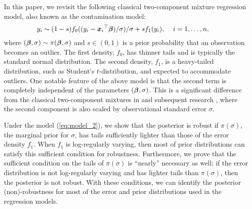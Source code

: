 \documentclass[12pt]{article}
\def\si{{\sigma}}
\def\si{{\sigma}}
\def\si{{\sigma}}
\def\bbe{{\text{\boldmath $\beta$}}}
\def\x{{\text{\boldmath $x$}}}
\begin{document}
In this paper, we revisit the following classical two-component mixture regression model, also known as the contamination model:
\begin{align}
\label{eq:model_2} 
&y_i \sim (1 - s) f_0 (( y_i - {\x _i}^{\top } \bbe ) / \si ) / \si + s f_1 ( y_i ) \text{,}  \ \ \ \ i=1,\ldots,n,
%
\end{align}
where $( \bbe , \si ) \sim \pi ( \bbe , \si )$ and $s \in (0, 1)$ is a prior probability that an observation becomes an outlier. 
The first density, $f_0$, has thinner tails and is typically the standard normal distribution. 
The second density, $f_1$, is a heavy-tailed distribution, such as Student's $t$-distribution, and expected to accommodate outliers. 
One notable feature of the above model is that the second term is completely independent of the parameters $( \bbe , \si )$. 
This is a significant difference from the classical two-component mixtures in \cite{box1968bayesian} and subsequent research \citep{tak2019robust,spg2020}, where the second component is also scaled by observational standard error $\sigma$. \ %

Under the model (\ref{eq:model_2}), we show that the posterior is robust if $\pi ( \si )$, the marginal prior for $\si $, has tails sufficiently lighter than those of the error density $f_1$. 
%
When $f_1$ is log-regularly varying, then most of prior distributions can satisfy this sufficient condition for robustness. 
Furthermore, we prove that the sufficient condition on the tails of $\pi ( \si )$ is ``nearly'' necessary as well; if the error distribution is not log-regularly varying and has lighter tails than $\pi ( \si )$, then the posterior is not robust. %
With these conditions, we can identify the posterior (non)-robustness for most of the error and prior distributions used in the regression models. 
\end{document}
